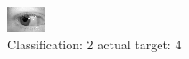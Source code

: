 \begin{figure}[h!]
\begin{center}
\includegraphics[width=0.60\columnwidth]{figures/ID839_class_2_target_4.png}
\end{center}
\caption{ Classification: 2 actual target: 4}
\label{fig:ID839_class_2_target_4}
\end{figure}
